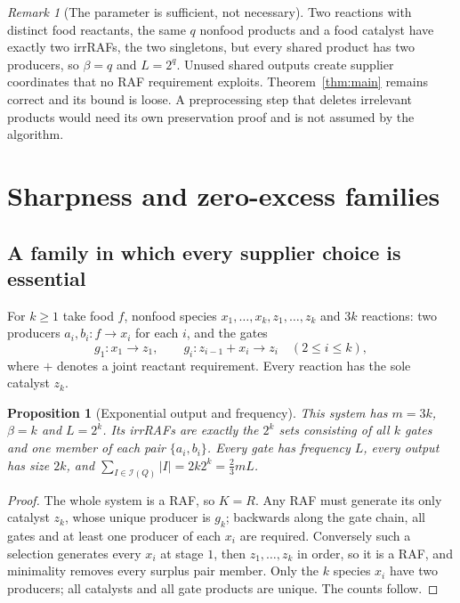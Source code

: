 \documentclass[11pt,a4paper]{article}
\theoremstyle{plain}
\newtheorem{proposition}[theorem]{Proposition}
\theoremstyle{definition}
\theoremstyle{remark}
\newtheorem{remark}[theorem]{Remark}
\newcommand{\Irr}{\mathcal I}
\begin{document}
\begin{remark}[The parameter is sufficient, not necessary]\label{rem:sufficient}
Two reactions with distinct food reactants, the same $q$ nonfood products and a food catalyst have exactly two irrRAFs, the two singletons, but every shared product has two producers, so $\beta=q$ and $L=2^q$. Unused shared outputs create supplier coordinates that no RAF requirement exploits. Theorem~\ref{thm:main} remains correct and its bound is loose. A preprocessing step that deletes irrelevant products would need its own preservation proof and is not assumed by the algorithm.
\end{remark}

\section{Sharpness and zero-excess families}\label{sec:sharp}

\subsection{A family in which every supplier choice is essential}

For $k\ge1$ take food $f$, nonfood species $x_1,\ldots,x_k,z_1,\ldots,z_k$ and $3k$ reactions: two producers $a_i,b_i\colon f\to x_i$ for each $i$, and the gates
\[
 g_1\colon x_1\to z_1,\qquad g_i\colon z_{i-1}+x_i\to z_i\quad(2\le i\le k),
\]
where $+$ denotes a joint reactant requirement. Every reaction has the sole catalyst $z_k$.

\begin{proposition}[Exponential output and frequency]\label{prop:sharp}
This system has $m=3k$, $\beta=k$ and $L=2^k$. Its irrRAFs are exactly the $2^k$ sets consisting of all $k$ gates and one member of each pair $\{a_i,b_i\}$. Every gate has frequency $L$, every output has size $2k$, and $\sum_{I\in\Irr(Q)}|I|=2k2^k=\tfrac23mL$.
\end{proposition}
\begin{proof}
The whole system is a RAF, so $K=R$. Any RAF must generate its only catalyst $z_k$, whose unique producer is $g_k$; backwards along the gate chain, all gates and at least one producer of each $x_i$ are required. Conversely such a selection generates every $x_i$ at stage $1$, then $z_1,\ldots,z_k$ in order, so it is a RAF, and minimality removes every surplus pair member. Only the $k$ species $x_i$ have two producers; all catalysts and all gate products are unique. The counts follow.
\end{proof}
\end{document}
